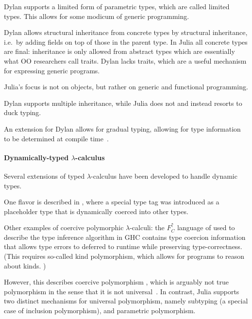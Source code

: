 \documentclass[pldi]{sigplanconf-pldi15}
\begin{document}
Dylan supports a limited form of parametric types, which are called limited
types.\cite{dylanman} This allows for some modicum of generic programming.

Dylan allows structural inheritance from concrete types by structural
inheritance, i.e.\ by adding fields on top of those in the parent type. In
Julia all concrete types are final: inheritance is only allowed from abstract
types which are essentially what OO researchers call traits. Dylan lacks
traits, which are a useful mechanism for expressing generic programs.

Julia's focus is not on objects, but rather on generic and functional
programming.

Dylan supports multiple inheritance, while Julia does not and instead resorts
to duck typing.

An extension for Dylan allows for gradual typing, allowing for type information
to be determined at compile time~\cite{Mehnert2010}.

\paragraph{Dynamically-typed $\lambda$-calculus}

Several extensions of typed $\lambda$-calculus have been developed to handle
dynamic types.

One flavor is described in \cite{Henglein1994}, where a special type tag
 was introduced as a placeholder type that is dynamically coerced
into other types. %

Other examples of coercive polymorphic $\lambda$-calculi: the $F^\uparrow_C$
language of \cite{Vytiniotis2012,Yorgey2012} used to describe the type
inference algorithm in GHC \cite{Weirich2011} contains type coercion
information that allows type errors to deferred to runtime
\cite{Vytiniotis2012} while preserving type-correctness. (This requires
so-called kind polymorphism, which allows for programs to reason about kinds.
\cite{Yorgey2012})


However, this describes coercive polymorphism \cite{Cardelli1985}, which
is arguably not true polymorphism in the sense that it is not
universal~\cite{Strachey1967,Strachey2000}. In contrast, Julia supports two
distinct mechanisms for universal polymorphism, namely subtyping (a special
case of inclusion polymorphism), and parametric polymorphism.
\end{document}
